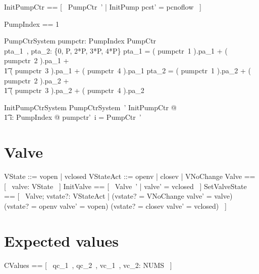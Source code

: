 \documentclass{report} %
\begin{document}
\begin{zed}
  InitPumpCtr == [~ PumpCtr~' | InitPump \land pcst' = pcnoflow ~]
\end{zed}

\begin{zed}
  PumpIndex == 1 
\end{zed}

\begin{schema}{PumpCtrSystem}
  pumpctr: PumpIndex \fun PumpCtr
  \\ %
  pta\_1~, pta\_2: \{0, P, 2*P, 3*P, 4*P\} 
  \where %
  pta\_1 =
    ( pumpctr~1 ).pa\_1 + ( pumpctr~2 ).pa\_1 +  %
    \\ \t1 %
    ( pumpctr~3 ).pa\_1 + ( pumpctr~4 ).pa\_1   %
  \also %
  pta\_2 =
    ( pumpctr~1 ).pa\_2 + ( pumpctr~2 ).pa\_2 +  %
    \\ \t1 %
    ( pumpctr~3 ).pa\_2 + ( pumpctr~4 ).pa\_2  %
\end{schema}

\begin{schema}{InitPumpCtrSystem}
  PumpCtrSystem~'
  \where %
  \exists InitPumpCtr @
  \\ %
  \t1 \forall i: PumpIndex @ pumpctr'~i = \theta PumpCtr~'
\end{schema}

\section{Valve}

\begin{zed}
  VState ::= vopen | vclosed
  \also %
  VStateAct ::= openv | closev | VNoChange 
  \also %
  Valve == [~ valve: VState ~]
  \also %
  InitValve == [~ Valve~' | valve' = vclosed ~]
  \also %
  SetValveState == [~ \Delta Valve; vstate?: VStateAct | (vstate? = VNoChange \implies valve' = valve) \land (vstate? = openv \implies valve' = vopen) \land (vstate? = closev \implies valve' = vclosed) ~]
\end{zed}

\section{Expected values}
\begin{zed}
  CValues == [~ qc\_1~, qc\_2~, vc\_1~, vc\_2: NUMS ~]
\end{zed}
\end{document}
